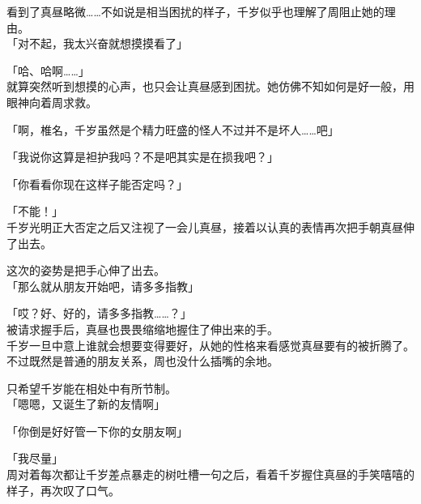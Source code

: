 看到了真昼略微……不如说是相当困扰的样子，千岁似乎也理解了周阻止她的理由。\\

「对不起，我太兴奋就想摸摸看了」

「哈、哈啊……」\\

就算突然听到想摸的心声，也只会让真昼感到困扰。她仿佛不知如何是好一般，用眼神向着周求救。

「啊，椎名，千岁虽然是个精力旺盛的怪人不过并不是坏人……吧」

「我说你这算是袒护我吗？不是吧其实是在损我吧？」

「你看看你现在这样子能否定吗？」

「不能！」\\

千岁光明正大否定之后又注视了一会儿真昼，接着以认真的表情再次把手朝真昼伸了出去。

这次的姿势是把手心伸了出去。\\

「那么就从朋友开始吧，请多多指教」

「哎？好、好的，请多多指教……？」\\

被请求握手后，真昼也畏畏缩缩地握住了伸出来的手。\\

千岁一旦中意上谁就会想要变得要好，从她的性格来看感觉真昼要有的被折腾了。不过既然是普通的朋友关系，周也没什么插嘴的余地。

只希望千岁能在相处中有所节制。\\

「嗯嗯，又诞生了新的友情啊」

「你倒是好好管一下你的女朋友啊」

「我尽量」\\

周对着每次都让千岁差点暴走的树吐槽一句之后，看着千岁握住真昼的手笑嘻嘻的样子，再次叹了口气。\\
